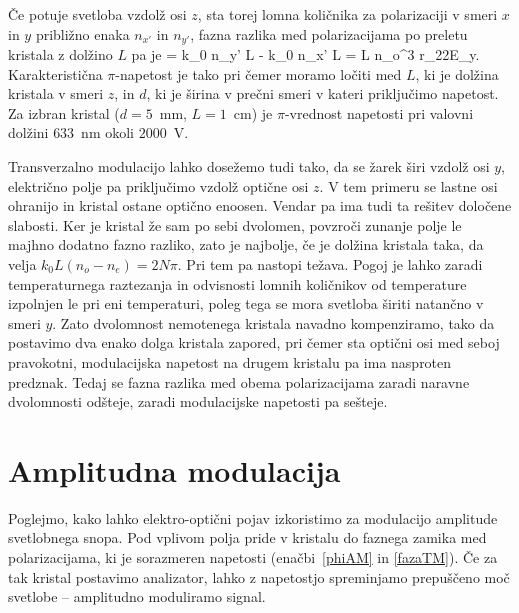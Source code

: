 Če potuje svetloba vzdolž osi $z$, sta torej lomna količnika za 
polarizaciji v smeri $x$ in $y$ približno enaka $n_{x'}$ in $n_{y'}$, fazna razlika med 
polarizacijama po preletu kristala z dolžino $L$ pa je 
\beq
\Delta \phi = k_0 n_{y'} L - k_0 n_{x'} L = L 
n_o^3 r_{22}E_y.
\label{fazaTM}
\eeq
Karakteristična $\pi$-napetost je tako
pri čemer moramo ločiti med $L$, ki je dolžina kristala v smeri $z$, in $d$, ki je  
širina v prečni smeri v kateri priključimo napetost. 
Za izbran kristal ($d=5$~mm, $L=1$~cm) je $\pi$-vrednost 
napetosti pri valovni dolžini $633$~nm okoli $2000$~V. 

\begin{remark}
Transverzalno modulacijo lahko dosežemo tudi tako, da se žarek širi vzdolž 
osi $y$, električno polje pa priključimo vzdolž optične osi $z$.
V tem primeru se lastne osi ohranijo in kristal ostane optično enoosen. Vendar 
pa ima tudi ta rešitev določene slabosti. Ker je kristal že sam po sebi dvolomen, 
povzroči zunanje polje le majhno dodatno fazno razliko, zato je najbolje, če je dolžina 
kristala taka, da velja $k_{0}L(n_{o}-n_{e})=2N\pi$. Pri tem pa nastopi težava. 
Pogoj je lahko zaradi temperaturnega raztezanja in odvisnosti lomnih količnikov od temperature
izpolnjen le pri eni temperaturi, poleg tega se mora svetloba širiti natančno v smeri $y$.
Zato dvolomnost nemotenega kristala navadno kompenziramo, tako da postavimo 
dva enako dolga kristala zapored, pri čemer sta optični
osi med seboj pravokotni, modulacijska napetost na drugem kristalu pa ima
nasproten predznak. Tedaj se fazna razlika med obema polarizacijama zaradi 
naravne dvolomnosti odšteje, zaradi modulacijske napetosti pa sešteje.
\end{remark}

\section{Amplitudna modulacija}
\label{chap:ampmod}
Poglejmo, kako lahko elektro-optični pojav izkoristimo za modulacijo
amplitude svetlobnega snopa. Pod vplivom polja pride v kristalu do
faznega zamika med polarizacijama, ki je sorazmeren napetosti 
(enačbi~\ref{phiAM} in \ref{fazaTM}).
Če za tak kristal postavimo analizator, lahko z napetostjo spreminjamo 
prepuščeno moč svetlobe -- amplitudno moduliramo signal.

